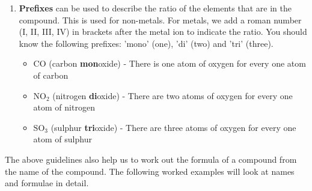 \begin{enumerate}[noitemsep, label=\textbf{\arabic*}. ]
\begin{table}[H]
\begin{center}
 \end{center}
\caption{Table of anions}
\label{tab:anions}
\end{table}

\label{m38708*uid43}\item \textbf{Prefixes} can be used to describe the ratio of the elements that are in the compound. This is used for non-metals. For metals, we add a roman number (I, II, III, IV) in brackets after the metal ion to indicate the ratio. You should know the following prefixes: 'mono' (one), 'di' (two) and 'tri' (three).
\label{m38708*id64977}\begin{itemize}[noitemsep]
            \label{m38708*uid44}\item $\text{CO}$ (carbon \textbf{mon}oxide) - There is one atom of oxygen for every one atom of carbon
\label{m38708*uid45}\item $\text{NO}{}_{2}$ (nitrogen \textbf{di}oxide) - There are two atoms of oxygen for every one atom of nitrogen
\label{m38708*uid46}\item $\text{SO}{}_{3}$ (sulphur \textbf{tri}oxide) - There are three atoms of oxygen for every one atom of sulphur
\end{itemize}
        \end{enumerate}
\label{m38708*id537402}The above guidelines also help us to work out the formula of a compound from the name of the compound. The following worked examples will look at names and formulae in detail.\par 
